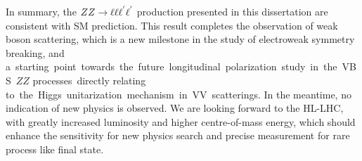 In summary, the $ZZ \rightarrow \ell\ell\ell^{'}\ell^{'}$ production presented in this dissertation are consistent with SM prediction.
This result completes the observation of weak boson scattering, which is a new milestone in the study of electroweak symmetry breaking,
and a starting point towards the future longitudinal polarization study in the VBS $ZZ$ processes directly relating to the Higgs unitarization mechanism in VV scatterings.
In the meantime, no indication of new physics is observed.
We are looking forward to the HL-LHC, with greatly increased luminosity and higher centre-of-mass energy, 
which should enhance the sensitivity for new physics search and precise measurement for rare process like \llll final state.

